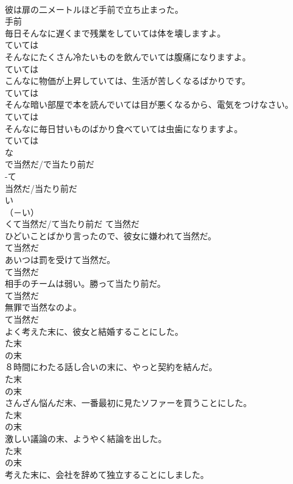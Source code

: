 \documentclass[8pt]{extreport}
\begin{document}
\begin{CJK}{UTF8}{min}
\\	彼は扉の二メートルほど手前で立ち止まった。	
\\	手前
\\	毎日そんなに遅くまで残業をしていては体を壊しますよ。	
\\	ていては
\\	そんなにたくさん冷たいものを飲んでいては腹痛になりますよ。	
\\	ていては
\\	こんなに物価が上昇していては、生活が苦しくなるばかりです。	
\\	ていては
\\	そんな暗い部屋で本を読んでいては目が悪くなるから、電気をつけなさい。	
\\	ていては
\\	そんなに毎日甘いものばかり食べていては虫歯になりますよ。	
\\	ていては
\\	な
\\	で当然だ/で当たり前だ	
\\	-て
\\	当然だ/当たり前だ	
\\	い
\\	（－い） 
\\	くて当然だ/て当たり前だ	て当然だ
\\	ひどいことばかり言ったので、彼女に嫌われて当然だ。	
\\	て当然だ
\\	あいつは罰を受けて当然だ。	
\\	て当然だ
\\	相手のチームは弱い。勝って当たり前だ。	
\\	て当然だ
\\	無罪で当然なのよ。	
\\	て当然だ
\\	よく考えた末に、彼女と結婚することにした。	
\\	た末 
\\	の末
\\	８時間にわたる話し合いの末に、やっと契約を結んだ。	
\\	た末 
\\	の末
\\	さんざん悩んだ末、一番最初に見たソファーを買うことにした。	
\\	た末 
\\	の末
\\	激しい議論の末、ようやく結論を出した。	
\\	た末 
\\	の末
\\	考えた末に、会社を辞めて独立することにしました。	

\end{CJK}
\end{document}
